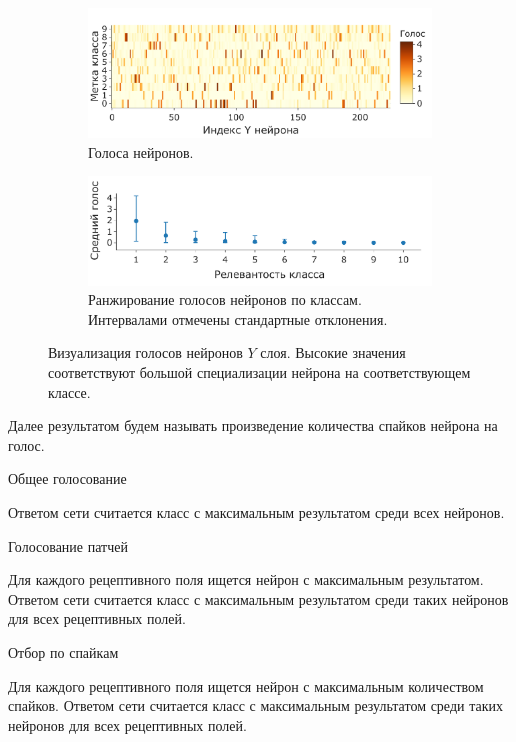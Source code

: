 \documentclass[a4paper]{article}
\begin{document}
\begin{figure}[H]
\centering
\begin{subfigure}{\textwidth}
    \includegraphics[width=\textwidth,keepaspectratio=true]{votes_ru.pdf}
    \caption{Голоса нейронов.}
\end{subfigure}
\begin{subfigure}{\textwidth} 
    \includegraphics[width=\textwidth,keepaspectratio=true]{votes_distribution_ru.pdf}
    \caption{Ранжирование голосов нейронов по классам. Интервалами отмечены стандартные отклонения.}
\end{subfigure}
\caption{Визуализация голосов нейронов $Y$ слоя. Высокие значения соответствуют большой специализации нейрона на соответствующем классе.}
\end{figure}

Далее результатом будем называть произведение количества спайков нейрона на голос.

\begin{center}
 Общее голосование
\end{center}
Ответом сети считается класс с максимальным результатом среди всех нейронов.

\begin{center}
 Голосование патчей
\end{center}
Для каждого рецептивного поля ищется нейрон с максимальным результатом. Ответом сети считается класс с максимальным результатом среди таких нейронов для всех рецептивных полей.

\begin{center}
 Отбор по спайкам
\end{center}
Для каждого рецептивного поля ищется нейрон с максимальным количеством спайков. Ответом сети считается класс с максимальным результатом среди таких нейронов для всех рецептивных полей.
\end{document}
